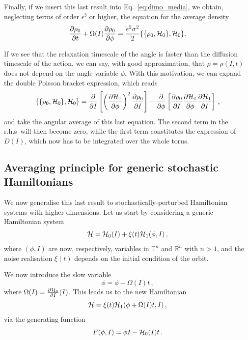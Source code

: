 Finally, if we insert this last result into Eq.~\eqref{eq:dimo_media}, we obtain, neglecting terms of order \(\epsilon^3\) or higher, the equation for the average density
\begin{equation}
 	\pdv{\rho_0}{t}\/ + \Omega (I) \pdv{\rho_0}{\phi}\/ = \frac{\epsilon^2 \sigma^2}{2}\{\{\rho_0, \mathcal{H}_0\}, \mathcal{H}_0\}.
\end{equation}

If we see that the relaxation timescale of the angle is faster than the diffusion timescale of the action, we can say, with good approximation, that \(\rho=\rho(I,t)\) does not depend on the angle variable \(\phi\). With this motivation, we can expand the double Poisson bracket expression, which reads
\begin{equation}
	\{\{\rho_0, \mathcal{H}_0\}, \mathcal{H}_0\} = \pdv{}{I}\/\left[\left(\pdv{\mathcal{H}_1}{\phi}\/\right)^2 \pdv{\rho_0}{I}\/\right] - \pdv{}{\phi}\/\left[\pdv{\rho_0}{I}\/\pdv{\mathcal{H}_1}{\phi}\/\pdv{\mathcal{H}_1}{I}\/\right]\,,
\end{equation}
and take the angular average of this last equation. The second term in the r.h.s\ will then become zero, while the first term constitutes the expression of \(D(I)\), which now has to be integrated over the whole torus.

\subsection{Averaging principle for generic stochastic Hamiltonians}

We now generalise this last result to stochastically-perturbed Hamiltonian systems with higher dimensions. Let us start by considering a generic Hamiltonian system
\begin{equation}
	\mathcal{H} = \mathcal{H}_0(I) + \xi(t)\mathcal{H}_1(\phi, I)\,,
\end{equation}
where \((\phi, I)\) are now, respectively, variables in $\mathbb{T}^n$ and $\mathbb{R}^n$ with $n>1$, and the noise realisation \(\xi(t)\) depends on the initial condition of the orbit.

We now introduce the slow variable
\begin{equation}
	\phi = \phi - \Omega(I)t\,,
\end{equation}
where \(\Omega(I) = \frac{\partial \mathcal{H}_0}{\partial I}(I)\). This leads us to the new Hamiltonian
\begin{equation}
	\mathcal{H} = \xi(t)\mathcal{H}_1(\phi+\Omega(I)t,I)\,,
\end{equation}
via the generating function
\begin{equation}
	F(\phi,I) = \phi I - \mathcal{H}_0(I)t\,.
\end{equation}

